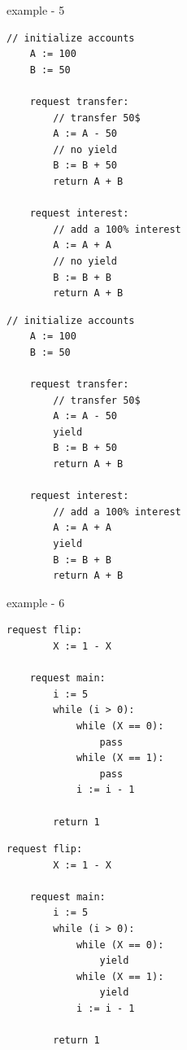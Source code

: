 \newpage

example - 5

\noindent
\begin{minipage}[t]{0.45\textwidth}
	\begin{lstlisting}[caption={bank (serializable)}]
    // initialize accounts
    A := 100
    B := 50
    
    request transfer: 
        // transfer 50$
        A := A - 50
        // no yield
        B := B + 50
        return A + B
			
    request interest: 
        // add a 100% interest
        A := A + A
        // no yield
        B := B + B
        return A + B	      		        
		\end{lstlisting}
\end{minipage}
\hfill
\begin{minipage}[t]{0.45\textwidth}
	\begin{lstlisting}[caption={bank with yields (non serializable)}]
    // initialize accounts
    A := 100
    B := 50
		
    request transfer: 
        // transfer 50$
        A := A - 50
        yield
        B := B + 50
        return A + B

    request interest: 
        // add a 100% interest
        A := A + A
        yield
        B := B + B
        return A + B	      		        
	\end{lstlisting}
\end{minipage}
	


example - 6


\noindent
\begin{minipage}[t]{0.45\textwidth}
	\begin{lstlisting}[caption={Complex while (serializable)}]
    request flip: 
        X := 1 - X 
    
    request main:
        i := 5
        while (i > 0):
            while (X == 0):
                pass
            while (X == 1):
                pass
            i := i - 1
        
        return 1       
		\end{lstlisting}
\end{minipage}%
\hfill
\begin{minipage}[t]{0.45\textwidth}
	\begin{lstlisting}[caption={Complex while with yields (not serializable)}]
    request flip: 
        X := 1 - X 

    request main:
        i := 5
        while (i > 0):
            while (X == 0):
                yield
            while (X == 1):
                yield
            i := i - 1

        return 1        
			\end{lstlisting}
\end{minipage}




